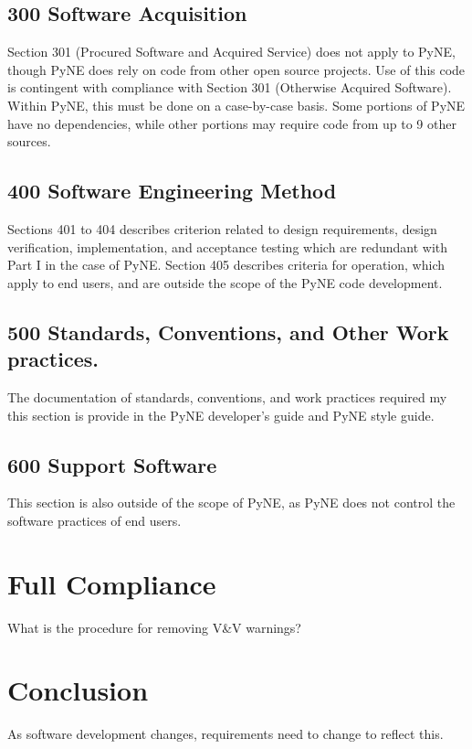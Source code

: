 \documentclass{anstrans}
\begin{document}
\subsection{300 Software Acquisition}

Section 301 (Procured Software and Acquired Service) does not apply to PyNE,
though PyNE does rely on code from other open source projects. Use of this code
is contingent with compliance with Section 301 (Otherwise Acquired Software).
Within PyNE, this must be done on a case-by-case basis. Some portions of PyNE
have no dependencies, while other portions may require code from up to 9 other
sources. 



\subsection{400 Software Engineering Method}

Sections 401 to 404 describes criterion related to design requirements, design
verification, implementation, and acceptance testing which are redundant with
Part I in the case of PyNE. Section 405 describes criteria for operation, which
apply to end users, and are outside the scope of the PyNE code development.


\subsection{500 Standards, Conventions, and Other Work practices.}

The documentation of standards, conventions, and work practices required my
this section is provide in the PyNE developer's guide and PyNE style guide.

\subsection{600 Support Software}
This section is also outside of the scope of PyNE, as PyNE does not control the software practices of end users.

\section{Full Compliance}



What is the procedure for removing V\&V warnings?


\section{Conclusion}

As software development changes, requirements need to change to reflect this.





\end{document}
